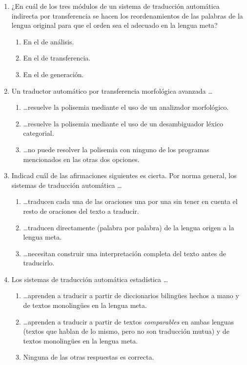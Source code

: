 \begin{enumerate}
\item ¿En cuál de los tres módulos de un sistema de traducción automática indirecta por transferencia se hacen los reordenamientos de las palabras de la lengua original para que el orden sea el adecuado en la lengua meta? \begin{enumerate} \item En el de análisis. \item En el de transferencia. \item En el de generación. \end{enumerate} 

\item Un traductor automático por transferencia morfológica avanzada \ldots \begin{enumerate} \item \ldots resuelve la polisemia mediante el uso de un analizador morfológico. \item \ldots resuelve la polisemia mediante el uso de un desambiguador léxico categorial. \item \ldots no puede resolver la polisemia con ninguno de los programas mencionados en las otras dos opciones. \end{enumerate} 

\item Indicad cuál de las afirmaciones siguientes es cierta. Por norma general, los sistemas de traducción automática \ldots\begin{enumerate} \item \ldots traducen cada una de las oraciones una por una sin tener en cuenta el resto de oraciones del texto a traducir. \item \ldots traducen directamente (palabra por palabra) de la lengua origen a la lengua meta. \item \ldots necesitan construir una interpretación completa del texto antes de traducirlo. \end{enumerate} 

\item Los sistemas de traducción automática estadística \ldots\begin{enumerate} \item \ldots aprenden a traducir a partir de diccionarios bilingües hechos a mano y de textos monolingües en la lengua meta. \item \ldots aprenden a traducir a partir de textos \emph{comparables} en ambas lenguas (textos que hablan de lo mismo, pero no son traducción mutua) y de textos monolingües en la lengua meta. \item Ninguna de las otras respuestas es correcta. \end{enumerate} 


\end{enumerate}
